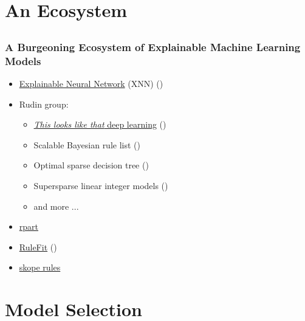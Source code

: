 \documentclass[11pt,aspectratio=169,hyperref={colorlinks}]{beamer}
\begin{document}
	\section{An Ecosystem}
			
		\subsection*{}
		
		\begin{frame}
		
			\frametitle{A Burgeoning Ecosystem of Explainable Machine Learning Models}		
			
			\begin{itemize}
				\item \href{https://www.mdpi.com/2078-2489/11/3/137}{Explainable Neural Network} (XNN) (\cite{wf_xnn})
				\item Rudin group: 
				\begin{itemize}
					\item \href{https://www.youtube.com/watch?v=k3IQnRsl9U4}{\textit{This looks like that} deep learning} (\cite{this_looks_like_that})
					\item Scalable Bayesian rule list (\cite{sbrl}) 
					\item Optimal sparse decision tree (\cite{osdt})
					\item Supersparse linear integer models (\cite{slim})
					\item and more ... 
				\end{itemize}
				\item \href{https://github.com/scikit-learn-contrib/skope-rules}{rpart}
				\item \href{https://christophm.github.io/interpretable-ml-book/rulefit.html}{RuleFit} (\cite{rulefit})
				\item \href{https://github.com/scikit-learn-contrib/skope-rules}{skope rules}
			\end{itemize}
		
		\end{frame}


	\section{Model Selection}
\end{document}
